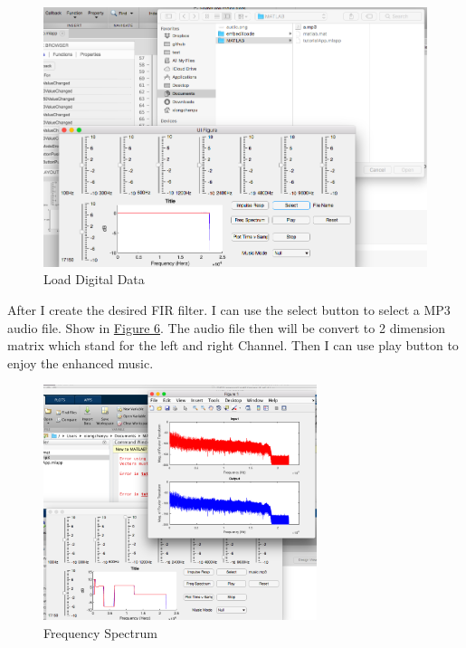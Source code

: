 \documentclass[titlepage]{article}
\begin{document}
\begin{figure}[htbp]
\caption{\label{fig:orgb9fd908}
Load Digital Data}
\centering
\includegraphics[width=12cm]{./img/2.png}
\end{figure}

After I create the desired FIR filter. I can use the select button
to select a MP3 audio file. Show in \hyperref[fig:orgb9fd908]{Figure 6}. The audio file then will be convert to 2
dimension matrix which stand for the left and right Channel. Then I can use
play button to enjoy the enhanced music.
\begin{figure}[htbp]
\caption{\label{fig:org2a0d4f2}
Frequency Spectrum}
\centering
\includegraphics[width=8cm]{./img/4.png}
\end{figure}
\end{document}
